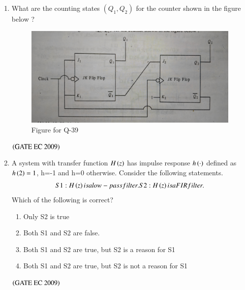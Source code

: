 \documentclass[journal,12pt,onecolumn]{IEEEtran}
\theoremstyle{remark}
\begin{document}
\begin{enumerate}
\item What are the counting states $(Q_1, Q_2)$ for the counter shown in the figure below ?
\begin{figure}[H]
    \centering
    \includegraphics[width=0.5\columnwidth]{figs/fig_17.jpg}
    \caption{\centering Figure for Q-39}
    \label{fig:placeholder_17}
\end{figure}
\begin{enumerate}
\end{enumerate}
\hfill $\brak{\text{GATE EC 2009}}$

\item A system with transfer function $H\brak{z}$ has impulse response $h\brak{\cdot}$ defined as $h\brak{2}=1$, h=-1 and h=0 otherwise. Consider the following statements.
\begin{align*}

    S1: H\brak{z} is a low-pass filter.
    
    S2: H\brak{z} is a FIR filter.
\end{align*}
Which of the following is correct?
\begin{enumerate}
        \item Only S2 is true
        \item Both S1 and S2 are false.
        \item Both S1 and S2 are true, but S2 is a reason for S1
        \item Both S1 and S2 are true, but S2 is not a reason for S1
\end{enumerate}
\hfill $\brak{\text{GATE EC 2009}}$


\end{enumerate}
\end{document}
